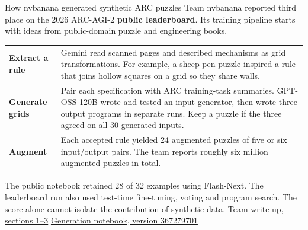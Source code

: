 \begin{frame}[t]{How nvbanana generated synthetic ARC puzzles}
\med
Team nvbanana reported third place on the 2026 ARC-AGI-2 \textbf{public leaderboard}. Its training pipeline starts with ideas from public-domain puzzle and engineering books.
\par\vspace{3mm}
\begin{tabular}{@{}>{\raggedright\arraybackslash\bfseries}p{38mm}>{\raggedright\arraybackslash}p{170mm}@{}}
Extract a rule & Gemini read scanned pages and described mechanisms as grid transformations. For example, a sheep-pen puzzle inspired a rule that joins hollow squares on a grid so they share walls.\\[2mm]
Generate grids & Pair each specification with ARC training-task summaries. GPT-OSS-120B wrote and tested an input generator, then wrote three output programs in separate runs. Keep a puzzle if the three agreed on all 30 generated inputs.\\[2mm]
Augment & Each accepted rule yielded 24 augmented puzzles of five or six input/output pairs. The team reports roughly six million augmented puzzles in total.\\
\end{tabular}
\par\vspace{3mm}
\smallbody The public notebook retained 28 of 32 examples using Flash-Next. The leaderboard run also used test-time fine-tuning, voting and program search. The score alone cannot isolate the contribution of synthetic data.
\vfill
\smallbody \href{https://www.kaggle.com/competitions/arc-prize-2026-arc-agi-2/writeups/arc-agi-2-public-3rd-place-solution}{\textcolor{accent}{Team write-up, sections 1--3}}\qquad
\href{https://www.kaggle.com/code/darraghdog/book-spec-to-arc-puzzles-with-flash?scriptVersionId=367279701}{\textcolor{accent}{Generation notebook, version 367279701}}
\end{frame}
